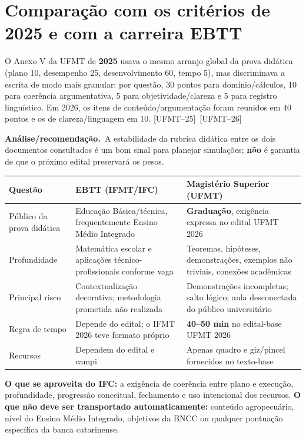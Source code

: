 \documentclass[11pt,a4paper]{article}
\newcommand{\infer}{\textbf{Análise/recomendação.}~}
\newcommand{\fufmt}{\textsf{[UFMT--26]}}
\newcommand{\fufmtv}{\textsf{[UFMT--25]}}
\begin{document}
\section{Comparação com os critérios de 2025 e com a carreira EBTT}
O Anexo V da UFMT de \textbf{2025} usava o mesmo arranjo global da prova didática (plano 10, desempenho 25, desenvolvimento 60, tempo 5), mas discriminava a escrita de modo mais granular: por questão, 30 pontos para domínio/cálculos, 10 para coerência argumentativa, 5 para objetividade/clareza e 5 para registro linguístico. Em 2026, os itens de conteúdo/argumentação foram reunidos em 40 pontos e os de clareza/linguagem em 10. \fufmtv\ \fufmt

\infer A estabilidade da rubrica didática entre os dois documentos consultados é um bom sinal para planejar simulações; \textbf{não} é garantia de que o próximo edital preservará os pesos.

\begin{tabularx}{\textwidth}{p{}XX}
\toprule
\textbf{Questão} & \textbf{EBTT (IFMT/IFC)} & \textbf{Magistério Superior (UFMT)}\\\midrule
Público da prova didática & Educação Básica/técnica, frequentemente Ensino Médio Integrado & \textbf{Graduação}, exigência expressa no edital UFMT 2026\\
Profundidade & Matemática escolar e aplicações técnico-profissionais conforme vaga & Teoremas, hipóteses, demonstrações, exemplos não triviais, conexões acadêmicas\\
Principal risco & Contextualização decorativa; metodologia prometida não realizada & Demonstrações incompletas; salto lógico; aula desconectada do público universitário\\
Regra de tempo & Depende do edital; o IFMT 2026 teve formato próprio & \textbf{40--50 min} no edital-base UFMT 2026\\
Recursos & Dependem do edital e campi & Apenas quadro e giz/pincel fornecidos no texto-base\\
\bottomrule
\end{tabularx}

\begin{ideia}
\textbf{O que se aproveita do IFC:} a exigência de coerência entre plano e execução, profundidade, progressão conceitual, fechamento e uso intencional dos recursos. \textbf{O que não deve ser transportado automaticamente:} conteúdo agropecuário, nível do Ensino Médio Integrado, objetivos da BNCC ou qualquer pontuação específica da banca catarinense.
\end{ideia}
\end{document}
